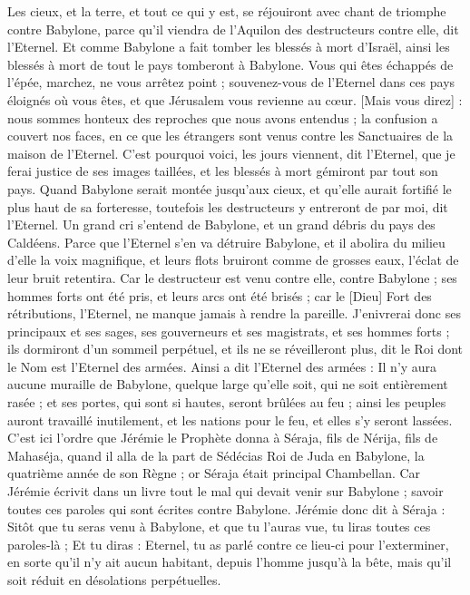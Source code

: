 \begin{multicols}{2}
Les cieux, et la terre, et tout ce qui y est, se réjouiront avec chant de triomphe contre Babylone, parce qu'il viendra de l'Aquilon des destructeurs contre elle, dit l'Eternel.
Et comme Babylone a fait tomber les blessés à mort d'Israël, ainsi les blessés à mort de tout le pays tomberont à Babylone.
Vous qui êtes échappés de l'épée, marchez, ne vous arrêtez point ; souvenez-vous de l'Eternel dans ces pays éloignés où vous êtes, et que Jérusalem vous revienne au cœur.
[Mais vous direz] : nous sommes honteux des reproches que nous avons entendus ; la confusion a couvert nos faces, en ce que les étrangers sont venus contre les Sanctuaires de la maison de l'Eternel.
C'est pourquoi voici, les jours viennent, dit l'Eternel, que je ferai justice de ses images taillées, et les blessés à mort gémiront par tout son pays.
Quand Babylone serait montée jusqu'aux cieux, et qu'elle aurait fortifié le plus haut de sa forteresse, toutefois les destructeurs y entreront de par moi, dit l'Eternel.
Un grand cri s'entend de Babylone, et un grand débris du pays des Caldéens.
Parce que l'Eternel s'en va détruire Babylone, et il abolira du milieu d'elle la voix magnifique, et leurs flots bruiront comme de grosses eaux, l'éclat de leur bruit retentira.
Car le destructeur est venu contre elle, contre Babylone ; ses hommes forts ont été pris, et leurs arcs ont été brisés ; car le [Dieu] Fort des rétributions, l'Eternel, ne manque jamais à rendre la pareille.
J'enivrerai donc ses principaux et ses sages, ses gouverneurs et ses magistrats, et ses hommes forts ; ils dormiront d'un sommeil perpétuel, et ils ne se réveilleront plus, dit le Roi dont le Nom est l'Eternel des armées.
Ainsi a dit l'Eternel des armées : Il n'y aura aucune muraille de Babylone, quelque large qu'elle soit, qui ne soit entièrement rasée ; et ses portes, qui sont si hautes, seront brûlées au feu ; ainsi les peuples auront travaillé inutilement, et les nations pour le feu, et elles s'y seront lassées.
C'est ici l'ordre que Jérémie le Prophète donna à Séraja, fils de Nérija, fils de Mahaséja, quand il alla de la part de Sédécias Roi de Juda en Babylone, la quatrième année de son Règne ; or Séraja était principal Chambellan.
Car Jérémie écrivit dans un livre tout le mal qui devait venir sur Babylone ; savoir toutes ces paroles qui sont écrites contre Babylone.
Jérémie donc dit à Séraja : Sitôt que tu seras venu à Babylone, et que tu l'auras vue, tu liras toutes ces paroles-là ;
Et tu diras : Eternel, tu as parlé contre ce lieu-ci pour l'exterminer, en sorte qu'il n'y ait aucun habitant, depuis l'homme jusqu'à la bête, mais qu'il soit réduit en désolations perpétuelles.

\end{multicols}
